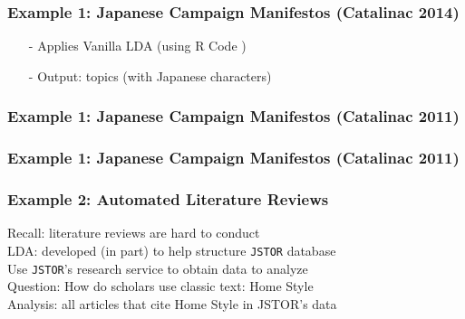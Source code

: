 \documentclass{beamer}
\numberwithin{equation}{section}
\begin{document}
\begin{frame}
\frametitle{Example 1:  Japanese Campaign Manifestos (Catalinac 2014)}

\begin{itemize}
\item[-] Applies Vanilla LDA (using R Code )
\item[-] Output: topics (with Japanese characters)
\end{itemize}

\end{frame}


\begin{frame}
\frametitle{Example 1: Japanese Campaign Manifestos (Catalinac 2011)}


\end{frame}


\begin{frame}
\frametitle{Example 1: Japanese Campaign Manifestos (Catalinac 2011)}


\end{frame}


\begin{frame}



\end{frame}




\begin{frame}
\frametitle{Example 2: Automated Literature Reviews}

\alert{Recall}: literature reviews are hard to conduct\\
\alert{LDA}: developed (in part) to help structure {\tt JSTOR} database\\
Use {\tt JSTOR}'s research service to obtain data to analyze\\
\alert{Question:} How do scholars use classic text: \alert{Home Style}\\
Analysis: all articles that cite \alert{Home Style} in JSTOR's data\\

\end{frame}
\end{document}
